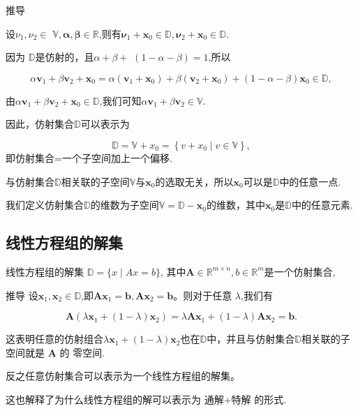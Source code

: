 \documentclass{lzureport}
\begin{document}
\begin{derivation}{推导}

设$\nu_1,\nu_2\in$ $\mathbb{V},\boldsymbol{\alpha},\boldsymbol{\beta}\in\mathbb{R}$,则有$\boldsymbol{\nu }_1+ \boldsymbol{x}_0\in \mathbb{D} , \boldsymbol{\nu }_2+ \boldsymbol{x}_0\in \mathbb{D}$.

因为 $\mathbb{D}$是仿射的，且$\alpha+\beta+$ $(1-\alpha-\beta)=1$,所以

$$\alpha \boldsymbol{v}_1+\beta \boldsymbol{v}_2+\boldsymbol{x}_0=\alpha\left(\boldsymbol{v}_1+\boldsymbol{x}_0\right)+\beta\left(\boldsymbol{v}_2+\boldsymbol{x}_0\right)+\left(1-\alpha-\beta\right)\boldsymbol{x}_0\in\mathbb{D},$$

由$\alpha\boldsymbol{v}_1+\beta\boldsymbol{v}_2+\boldsymbol{x}_0\in\mathbb{D}$,我们可知$\alpha\boldsymbol{v}_1+\beta\boldsymbol{v}_2\in\mathbb{V}.$

因此，仿射集合$\mathbb{D}$可以表示为

$$\mathbb{D}=\mathbb{V}+x_0=\left\{v+x_0\mid v\in\mathbb{V}\right\},$$
即仿射集合=\textcolor{YBXPurple}{一个子空间加上一个偏移}.
\end{derivation}

与仿射集合$\mathbb{D}$相关联的子空间$\mathbb{V}$与$\boldsymbol x_0$的选取无关，所以$\boldsymbol x_0$可以是$\mathbb{D}$中的任意一点.

我们定义仿射集合$\mathbb{D}$的维数为子空间$\mathbb{V}=\mathbb{D}-\boldsymbol{x}_0$的维数，其中$\boldsymbol x_0$是$\mathbb{D}$中的任意元素.

\subsection{线性方程组的解集}

线性方程组的解集 $\mathbb{D}=\{x\mid Ax=b\}$,
其中$\boldsymbol{A}\in\mathbb{R}^{m\times n}, b \in \mathbb{R}^{m}$是一个仿射集合,


\begin{derivation}{推导}
	设$\boldsymbol x_1,\boldsymbol{x}_2\in\mathbb{D}$,即$\boldsymbol{Ax}_1=\boldsymbol{b},\boldsymbol{Ax}_2=\boldsymbol{b}$。则对于任意 $\lambda$,我们有

	$$\boldsymbol{A}\left(\lambda \boldsymbol{x}_1+(1-\lambda)\boldsymbol{x}_2\right)=\lambda \boldsymbol{A}\boldsymbol{x}_1+(1-\lambda)\boldsymbol{A}\boldsymbol{x}_2=\boldsymbol{b}.$$

	这表明任意的仿射组合$\lambda\boldsymbol x_1+(1-\lambda)\boldsymbol x_2$也在$\mathbb{D}$中，并且与仿射集合$\mathbb{D}$相关联的子空间就是 $\boldsymbol{A}$ 的 \textcolor{YBXPurple}{零空间}.

	反之任意仿射集合可以表示为一个线性方程组的解集。

	这也解释了为什么线性方程组的解可以表示为 \textcolor{YBXPurple}{通解+特解} 的形式.
\end{derivation}
\end{document}
